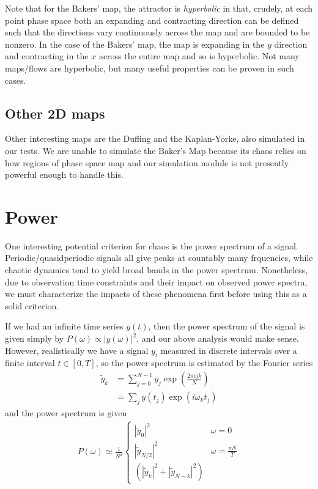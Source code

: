 \documentclass[10pt]{article}
\newcommand{\abs}[1]{\left|#1\right|}
\begin{document}
Note that for the Bakers' map, the attractor is \emph{hyperbolic} in that,
crudely, at each point phase space both an expanding and contracting direction
can be defined such that the directions vary continuously across the map and are
bounded to be nonzero. In the case of the Bakers' map, the map is expanding in
the $y$ direction and contracting in the $x$ across the entire map and so is
hyperbolic. Not many maps/flows are hyperbolic, but many useful properties can
be proven in such cases.

\subsection{Other 2D maps}

Other interesting maps are the Duffing and the Kaplan-Yorke, also simulated in
our tests. We are unable to simulate the Baker's Map because its chaos relies on
how regions of phase space map and our simulation module is not presently
powerful enough to handle this.

\clearpage

\section{Power}

One interesting potential criterion for chaos is the power spectrum of a signal.
Periodic/quasidperiodic signals all give peaks at countably many frquencies,
while chaotic dynamics tend to yield broad bands in the power spectrum.
Nonetheless, due to observation time constraints and their impact on observed
power spectra, we must characterize the impacts of these phenomena first before
using this as a solid criterion.

If we had an infinite time series $y(t)$, then the power spectrum of the signal
is given simply by $P(\omega) \propto \abs{y(\omega)}^2$, and our above
analysis would make sense. However, realistically we have a signal $y_i$
measured in discrete intervals over a finite interval $t \in [0,T]$, so the
power spectrum is estimated by the Fourier series
\begin{align}
    \tilde{y}_k &= \sum\limits_{j=0}^{N-1}y_j \exp \left( \frac{2\pi ijk}{N}
    \right)\\
    &= \sum\limits_{j}^{}y(t_j) \exp \left( i \omega_k t_j \right)
\end{align}
and the power spectrum is given
\begin{align}
    P(\omega) \simeq
    \frac{1}{N^2}
    \begin{cases}
        \abs{\tilde{y}_0}^2 & \omega = 0\\
        \abs{\tilde{y}_{N/2}}^2 & \omega = \frac{\pi N}{T}\\
        \left( \abs{\tilde{y}_k}^2 + \abs{\tilde{y}_{N-k}}^2 \right)
    \end{cases}
\end{align}
\end{document}
